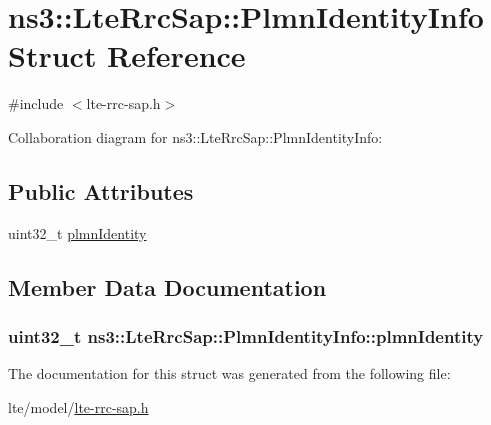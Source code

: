 \hypertarget{structns3_1_1LteRrcSap_1_1PlmnIdentityInfo}{}\section{ns3\+:\+:Lte\+Rrc\+Sap\+:\+:Plmn\+Identity\+Info Struct Reference}
\label{structns3_1_1LteRrcSap_1_1PlmnIdentityInfo}


{\ttfamily \#include $<$lte-\/rrc-\/sap.\+h$>$}



Collaboration diagram for ns3\+:\+:Lte\+Rrc\+Sap\+:\+:Plmn\+Identity\+Info\+:
\subsection*{Public Attributes}
\begin{DoxyCompactItemize}
\item 
uint32\+\_\+t \hyperlink{structns3_1_1LteRrcSap_1_1PlmnIdentityInfo_ac2a2d3c65d71ebb79f789d490d0bbb96}{plmn\+Identity}
\end{DoxyCompactItemize}


\subsection{Member Data Documentation}
\subsubsection[{\texorpdfstring{plmn\+Identity}{plmnIdentity}}]{\setlength{\rightskip}{0pt plus 5cm}uint32\+\_\+t ns3\+::\+Lte\+Rrc\+Sap\+::\+Plmn\+Identity\+Info\+::plmn\+Identity}\hypertarget{structns3_1_1LteRrcSap_1_1PlmnIdentityInfo_ac2a2d3c65d71ebb79f789d490d0bbb96}{}\label{structns3_1_1LteRrcSap_1_1PlmnIdentityInfo_ac2a2d3c65d71ebb79f789d490d0bbb96}


The documentation for this struct was generated from the following file\+:\begin{DoxyCompactItemize}
\item 
lte/model/\hyperlink{lte-rrc-sap_8h}{lte-\/rrc-\/sap.\+h}\end{DoxyCompactItemize}
